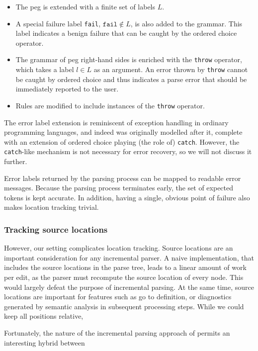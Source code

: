 
\begin{itemize}
	\item The \acrlong{peg} is extended with a finite set of labels $L$.
	\item A special failure label \texttt{fail}, $\texttt{fail} \not \in L$, is
	also added to the grammar. This label indicates a benign failure that can be
	caught by the ordered choice operator.
	\item The grammar of \acrlong{peg} right-hand sides is enriched with the
	\texttt{throw} operator, which takes a label $l \in L$ as an argument. An
	error thrown by \texttt{throw} cannot be caught by ordered choice and thus
	indicates a parse error that should be immediately reported to the user.
	\item Rules are modified to include instances of the \texttt{throw}
	operator.
\end{itemize}

The error label extension is reminiscent of exception handling in ordinary
programming languages, and indeed was originally modelled after it, complete
with an extension of ordered choice playing (the role of)
\texttt{catch}\cite{demedeiros2016parsing}. However, the \texttt{catch}-like
mechanism is not necessary for error recovery, so we will not discuss it
further.

Error labels returned by the parsing process can be mapped to readable error
messages. Because the parsing process terminates early, the set of expected
tokens is kept accurate. In addition, having a single, obvious point of failure
also makes location tracking trivial.

\subsubsection*{Tracking source locations}

However, our setting complicates location tracking. Source locations are an
important consideration for any incremental parser. A naive implementation, that
includes the source locations in the parse tree, leads to a linear amount of
work per edit, as the parser must recompute the source location of every node.
This would largely defeat the purpose of incremental parsing. At the same time,
source locations are important for features such as go to definition, or
diagnostics generated by semantic analysis in subsequent processing steps. While
we could keep all positions relative,

Fortunately, the nature of the incremental parsing approach of
\citeauthor{dubroy2017incremental_packrat_parsing} permits an interesting hybrid
between


